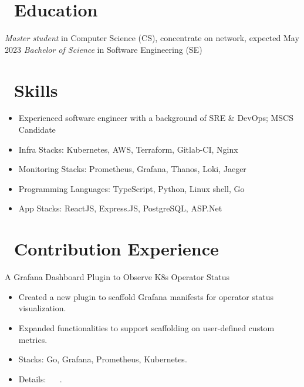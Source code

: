 \documentclass{resume}
\begin{document}



\section{\faGraduationCap\ Education}
\textit{Master student} in Computer Science (CS), concentrate on network, expected May 2023
\textit{Bachelor of Science} in Software Engineering (SE)

\section{\faCogs\ Skills}
\begin{itemize}[parsep=0.5ex]
  \item Experienced software engineer with a background of SRE \& DevOps; MSCS Candidate
  \item Infra Stacks: Kubernetes, AWS, Terraform, Gitlab-CI, Nginx
  \item Monitoring Stacks: Prometheus, Grafana, Thanos, Loki, Jaeger
  \item Programming Languages: TypeScript, Python, Linux shell, Go
  \item App Stacks: ReactJS, Express.JS, PostgreSQL, ASP.Net
\end{itemize}

\section{\faUsers\ Contribution Experience}
A Grafana Dashboard Plugin to Observe K8s Operator Status
\begin{itemize}
  \item Created a new plugin to scaffold Grafana manifests for operator status visualization.
  \item Expanded functionalities to support scaffolding on user-defined custom metrics.
  \item Stacks: Go, Grafana, Prometheus, Kubernetes.
  \item Details:
     \textperiodcentered\
     \textperiodcentered\
    .
\end{itemize}
\end{document}
